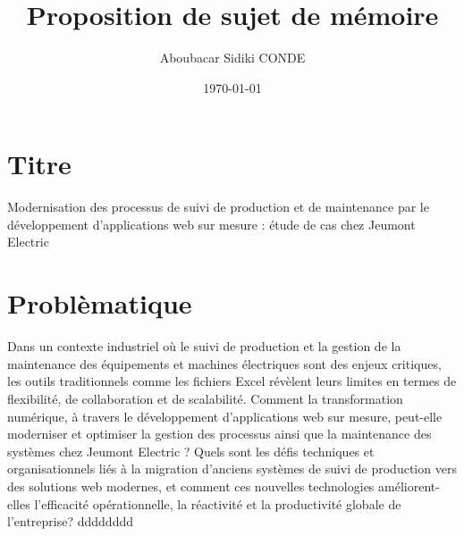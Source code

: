 \documentclass{article}
\title{Proposition de sujet de mémoire}
\author{Aboubacar Sidiki CONDE}
\date{\today}
\begin{document}
\maketitle


\section{Titre}
Modernisation des processus de suivi de production et de maintenance par le développement d'applications web sur mesure : étude de cas chez Jeumont Electric
\section{Problèmatique}
Dans un contexte industriel où le suivi de production et la gestion de la maintenance des équipements et machines électriques sont des enjeux critiques, les outils traditionnels comme les fichiers Excel révèlent leurs limites en termes de flexibilité, de collaboration et de scalabilité. Comment la transformation numérique, à travers le développement d’applications web sur mesure, peut-elle moderniser et optimiser la gestion des processus ainsi que la maintenance des systèmes chez Jeumont Electric ? Quels sont les défis techniques et organisationnels liés à la migration d’anciens systèmes de suivi de production vers des solutions web modernes, et comment ces nouvelles technologies améliorent-elles l’efficacité opérationnelle, la réactivité et la productivité globale de l’entreprise?
dddddddd
\end{document}
